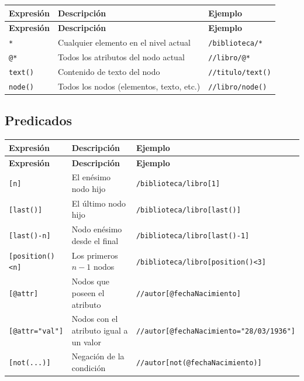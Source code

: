 \documentclass[a4paper, 8pt]{extarticle}
\begin{document}
\begin{longtable}{@{} p{4cm} p{7cm} p{6.5cm} @{}}
\toprule
\textbf{Expresión} & \textbf{Descripción} & \textbf{Ejemplo} \\
\midrule
\endfirsthead
\toprule
\textbf{Expresión} & \textbf{Descripción} & \textbf{Ejemplo} \\
\midrule
\endhead
\bottomrule
\endfoot
\bottomrule
\endlastfoot

\centering \verb!*!      & Cualquier elemento en el nivel actual    & \verb!/biblioteca/*!   \\
\centering \verb!@*!     & Todos los atributos del nodo actual      & \verb!//libro/@*!      \\
\centering \verb!text()! & Contenido de texto del nodo              & \verb!//titulo/text()! \\
\centering \verb!node()! & Todos los nodos (elementos, texto, etc.) & \verb!//libro/node()!  \\
\end{longtable}

\subsection*{Predicados}

\begin{longtable}{@{} p{4cm} p{7cm} p{6.5cm} @{}}
\toprule
\textbf{Expresión} & \textbf{Descripción} & \textbf{Ejemplo} \\
\midrule
\endfirsthead
\toprule
\textbf{Expresión} & \textbf{Descripción} & \textbf{Ejemplo} \\
\midrule
\endhead
\bottomrule
\endfoot
\bottomrule
\endlastfoot

\centering \verb![n]!            & El enésimo nodo hijo                   & \verb!/biblioteca/libro[1]!                   \\
\centering \verb![last()]!       & El último nodo hijo                    & \verb!/biblioteca/libro[last()]!              \\
\centering \verb![last()-n]!     & Nodo enésimo desde el final            & \verb!/biblioteca/libro[last()-1]!            \\
\centering \verb![position()<n]! & Los primeros $n-1$ nodos               & \verb!/biblioteca/libro[position()<3]!        \\
\centering \verb![@attr]!        & Nodos que poseen el atributo           & \verb!//autor[@fechaNacimiento]!              \\
\centering \verb![@attr="val"]!  & Nodos con el atributo igual a un valor & \verb!//autor[@fechaNacimiento="28/03/1936"]! \\
\centering \verb![not(...)]!     & Negación de la condición               & \verb!//autor[not(@fechaNacimiento)]!         \\
\end{longtable}
\end{document}
